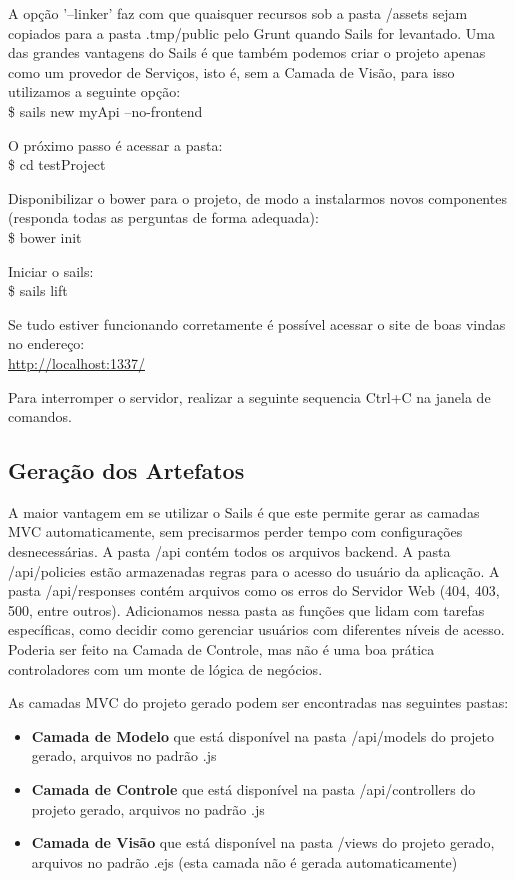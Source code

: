 \documentclass[a4paper,11pt]{article}
\begin{document}
A opção '--linker' faz com que quaisquer recursos sob a pasta /assets sejam copiados para a pasta .tmp/public pelo Grunt quando Sails for levantado. Uma das grandes vantagens do Sails é que também podemos criar o projeto apenas como um provedor de Serviços, isto é, sem a Camada de Visão, para isso utilizamos a seguinte opção: \\
{\ttfamily\$ sails new myApi --no-frontend}

O próximo passo é acessar a pasta: \\
{\ttfamily\$ cd testProject}

Disponibilizar o bower para o projeto, de modo a instalarmos novos componentes (responda todas as perguntas de forma adequada): \\
{\ttfamily\$ bower init}

Iniciar o sails: \\
{\ttfamily\$ sails lift}

Se tudo estiver funcionando corretamente é possível acessar o site de boas vindas no endereço: \\
\url{http://localhost:1337/}

Para interromper o servidor, realizar a seguinte sequencia {\ttfamily Ctrl+C} na janela de comandos.

\subsection{Geração dos Artefatos}
A maior vantagem em se utilizar o Sails é que este permite gerar as camadas MVC automaticamente, sem precisarmos perder tempo com configurações desnecessárias. A pasta /api contém todos os arquivos backend. A pasta /api/policies estão armazenadas regras para o acesso do usuário da aplicação. A pasta /api/responses contém arquivos como os erros do Servidor Web (404, 403, 500, entre outros). Adicionamos nessa pasta as funções que lidam com tarefas específicas, como decidir como gerenciar usuários com diferentes níveis de acesso. Poderia ser feito na Camada de Controle, mas não é uma boa prática controladores com um monte de lógica de negócios.

As camadas MVC do projeto gerado podem ser encontradas nas seguintes pastas: \vspace{-1em}
\begin{itemize}
  \item \textbf{Camada de Modelo} que está disponível na pasta /api/models do projeto gerado, arquivos no padrão .js
  \item \textbf{Camada de Controle} que está disponível na pasta /api/controllers do projeto gerado, arquivos no padrão .js
  \item \textbf{Camada de Visão} que está disponível na pasta /views do projeto gerado, arquivos no padrão .ejs 
  (esta camada não é gerada automaticamente)
\end{itemize}
\end{document}

